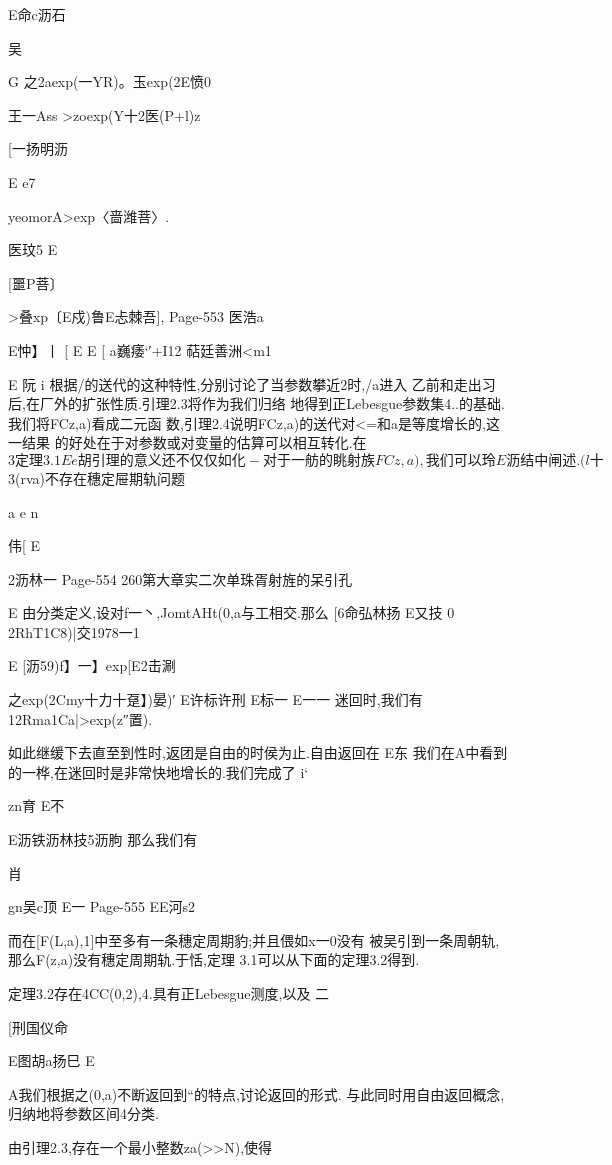 {{E命c沥石

吴

G
之2aexp(一YR)。玉exp(2E愤0

王一Ass
>zoexp(Y十2医(P+l)z

[一扬明沥

E
e7

yeomorA>exp〈啬潍菩〉.

医玟5
E

[噩P菩〕

>叠xp〔E戍)鲁E忐棘吾],
Page-553
医浩a

E忡】丨
[
E
E
[
a巍痿`′+I12
萜廷善洲<m1

E
阮
i
根据/的送代的这种特性,分别讨论了当参数攀近2时,/a进入
乙前和走出习后,在厂外的扩张性质.引理2.3将作为我们归络
地得到正Lebesgue参数集4..的基础.我们将FCz,a)看成二元函
数,引理2.4说明FCz,a)的送代对<=和a是等度增长的,这一结果
的好处在于对参数或对变量的估算可以相互转化.在$3定理3.1
Ee胡
引理的意义还不仅仅如化-对于一舫的眺射族FCz,a),我们可以
玲
E沥
结中闸述.

(l十

$3(rva)不存在穗定屉期轨问题

a
e
n

伟[
E

2沥林一
Page-554
260第大章实二次单珠胥射旌的呆引孔

E
由分类定义,设对f一丶,JomtAHt(0,a与工相交.那么
[6命弘林扬
E又技
0
2RhT1C8)|交1978一1

E
[沥59)f】一】exp[E2击涮

之exp(2Cmy十力十趸】)晏)′
E许标许刑
E标一
E一一
迷回时,我们有
12Rma1Ca|>exp(z″置).

如此继缓下去直至到性时,返团是自由的时侯为止.自由返回在
E东
我们在A中看到的一桦,在迷回时是非常快地增长的.我们完成了
i`

zn育
E不

E沥铁沥林技5沥朐
那么我们有

肖

gn吴c顶
E一
Page-555
EE河s2

而在[F(L,a),1]中至多有一条穗定周期豹;并且偎如x一0没有
被吴引到一条周朝轨,那么F(z,a)没有穗定周期轨.于恬,定理
3.1可以从下面的定理3.2得到.

定理3.2存在4CC(0,2),4.具有正Lebesgue测度,以及
二

[刑国仪命

E图胡a扬巳
E

A我们根据之(0,a)不断返回到“的特点,讨论返回的形式.
与此同时用自由返回概念,归纳地将参数区间4分类.

由引理2.3,存在一个最小整数za(>>N),使得

}}
